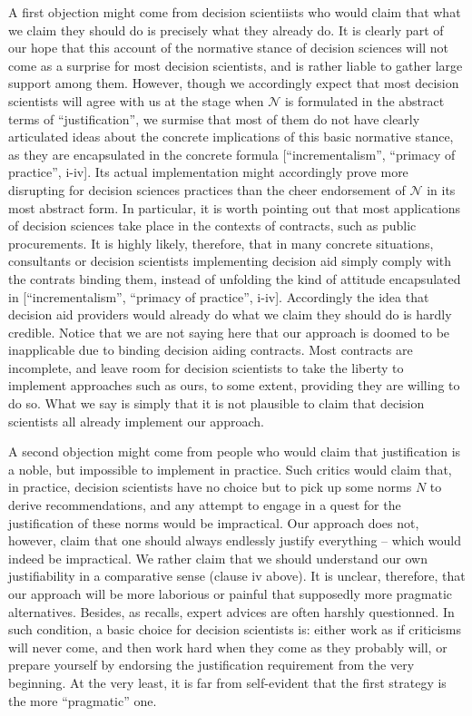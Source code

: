 \documentclass[preprint, french, english, 11pt, authoryear]{elsarticle}%
\newcommand{\adv}{\mathscr{N}}
\begin{document}
A first objection might come from decision scientiists who would claim that what we claim they should do is precisely what they already do. It is clearly part of our hope that this account of the normative stance of decision sciences will not come as a surprise for most decision scientists, and is rather liable to gather large support among them. However, though we accordingly expect that most decision scientists will agree with us at the stage when $\adv$ is formulated in the abstract terms of ``justification'', we surmise that most of them do not have clearly articulated ideas about the concrete implications of this basic normative stance, as they are encapsulated in the concrete formula [``incrementalism'', ``primacy of practice'', i-iv]. Its actual implementation might accordingly prove more disrupting for decision sciences practices than the cheer endorsement of $\adv$ in its most abstract form. In particular, it is worth pointing out that most applications of decision sciences take place in the contexts of contracts, such as public procurements. It is highly likely, therefore, that in many concrete situations, consultants or decision scientists implementing decision aid simply comply with the contrats binding them, instead of unfolding the kind of attitude encapsulated in [``incrementalism'', ``primacy of practice'', i-iv]. Accordingly the idea that decision aid providers would already do what we claim they should do is hardly credible. Notice that we are not saying here that our approach is doomed to be inapplicable due to binding decision aiding contracts. Most contracts are incomplete, and leave room for decision scientists to take the liberty to implement approaches such as ours, to some extent, providing they are willing to do so. What we say is simply that it is not plausible to claim that decision scientists all already implement our approach.

A second objection might come from people who would claim that justification is a noble, but impossible to implement in practice. Such critics would claim that, in practice, decision scientists have no choice but to pick up some norms $N$ to derive recommendations, and any attempt to engage in a quest for the justification of these norms would be impractical. Our approach does not, however, claim that one should always endlessly justify everything -- which would indeed be impractical. We rather claim that we should understand our own justifiability in a comparative sense (clause iv above). It is unclear, therefore, that our approach will be more laborious or painful that supposedly more pragmatic alternatives. Besides, as \citet{godard_environnement_2015} recalls, expert advices are often harshly questionned. In such condition, a basic choice for decision scientists is: either work as if criticisms will never come, and then work hard when they come as they probably will, or prepare yourself by endorsing the justification requirement from the very beginning. At the very least, it is far from self-evident that the first strategy is the more ``pragmatic'' one.
\end{document}
